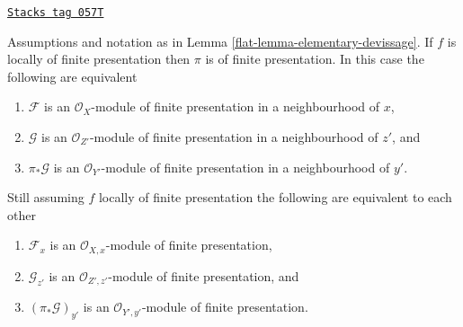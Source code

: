 \begin{lemma}
\label{flat-lemma-devissage-finite-presentation}
\href{https://stacks.math.columbia.edu/tag/057T}{\texttt{Stacks tag 057T}}

Assumptions and notation as in
Lemma \ref{flat-lemma-elementary-devissage}.
If $f$ is locally of finite presentation
then $\pi$ is of finite presentation.
In this case the following are equivalent
\begin{enumerate}
\item $\mathcal{F}$ is an $\mathcal{O}_X$-module of finite presentation
in a neighbourhood of $x$,
\item $\mathcal{G}$ is an $\mathcal{O}_{Z'}$-module of finite presentation
in a neighbourhood of $z'$, and
\item $\pi_*\mathcal{G}$ is an $\mathcal{O}_{Y'}$-module of
finite presentation in a neighbourhood of $y'$.
\end{enumerate}
Still assuming $f$ locally of finite presentation the following are
equivalent to each other
\begin{enumerate}
\item[(a)] $\mathcal{F}_x$ is an $\mathcal{O}_{X, x}$-module of finite
presentation,
\item[(b)] $\mathcal{G}_{z'}$ is an $\mathcal{O}_{Z', z'}$-module of
finite presentation, and
\item[(c)] $(\pi_*\mathcal{G})_{y'}$ is an $\mathcal{O}_{Y', y'}$-module
of finite presentation.
\end{enumerate}
\end{lemma}

